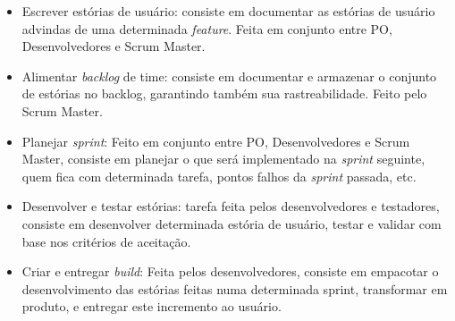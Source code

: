 \begin{itemize}
  \item Escrever estórias de usuário: consiste em documentar as estórias de usuário advindas de uma determinada \emph{feature}. Feita em conjunto entre PO, Desenvolvedores e Scrum Master.
  \item Alimentar \emph{backlog} de time: consiste em documentar e armazenar o conjunto de estórias no backlog, garantindo também sua rastreabilidade. Feito pelo Scrum Master.
  \item Planejar \emph{sprint}: Feito em conjunto entre PO, Desenvolvedores e Scrum Master, consiste em planejar o que será implementado na \emph{sprint} seguinte, quem fica com determinada tarefa, pontos falhos da \emph{sprint} passada, etc.
  \item Desenvolver e testar estórias: tarefa feita pelos desenvolvedores e testadores, consiste em desenvolver determinada estória de usuário, testar e validar com base nos critérios de aceitação.
  \item Criar e entregar \emph{build}: Feita pelos desenvolvedores, consiste em empacotar o desenvolvimento das estórias feitas numa determinada sprint, transformar em produto, e entregar este incremento ao usuário.
\end{itemize}